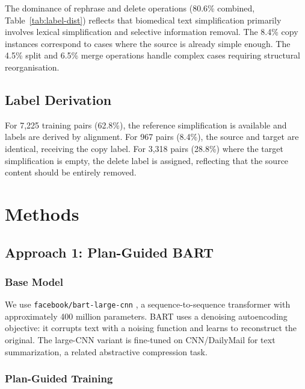 \documentclass{ceurart}
\begin{document}
The dominance of rephrase and delete operations (80.6\% combined, Table~\ref{tab:label-dist}) reflects that biomedical text simplification primarily involves lexical simplification and selective information removal.
The 8.4\% copy instances correspond to cases where the source is already simple enough.
The 4.5\% split and 6.5\% merge operations handle complex cases requiring structural reorganisation.

\subsection{Label Derivation}\label{subsec:label-derivation}

For 7,225 training pairs (62.8\%), the reference simplification is available and labels are derived by alignment.
For 967 pairs (8.4\%), the source and target are identical, receiving the copy label.
For 3,318 pairs (28.8\%) where the target simplification is empty, the delete label is assigned, reflecting that the source content should be entirely removed.

\section{Methods}

\subsection{Approach 1: Plan-Guided BART}

\subsubsection{Base Model}

We use \texttt{facebook/bart-large-cnn} \cite{bart2020}, a sequence-to-sequence transformer with approximately 400 million parameters.
BART uses a denoising autoencoding objective: it corrupts text with a noising function and learns to reconstruct the original.
The large-CNN variant is fine-tuned on CNN/DailyMail for text summarization, a related abstractive compression task.

\subsubsection{Plan-Guided Training}
\end{document}

